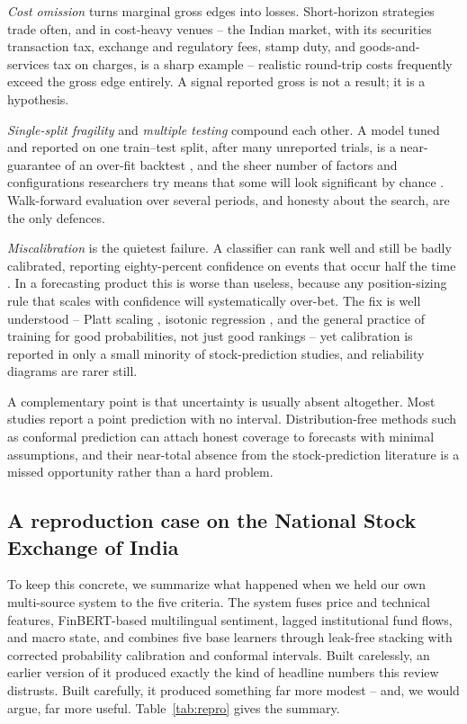 \documentclass[10pt,a4paper,twocolumn]{article}
\begin{document}
\textit{Cost omission} turns marginal gross edges into losses. Short-horizon strategies trade often, and in cost-heavy venues -- the Indian market, with its securities transaction tax, exchange and regulatory fees, stamp duty, and goods-and-services tax on charges, is a sharp example -- realistic round-trip costs frequently exceed the gross edge entirely. A signal reported gross is not a result; it is a hypothesis.

\textit{Single-split fragility} and \textit{multiple testing} compound each other. A model tuned and reported on one train--test split, after many unreported trials, is a near-guarantee of an over-fit backtest \cite{bailey2014}, and the sheer number of factors and configurations researchers try means that some will look significant by chance \cite{harvey2016}. Walk-forward evaluation over several periods, and honesty about the search, are the only defences.

\textit{Miscalibration} is the quietest failure. A classifier can rank well and still be badly calibrated, reporting eighty-percent confidence on events that occur half the time \cite{guo2017}. In a forecasting product this is worse than useless, because any position-sizing rule that scales with confidence will systematically over-bet. The fix is well understood -- Platt scaling \cite{platt1999}, isotonic regression \cite{zadrozny2002}, and the general practice of training for good probabilities, not just good rankings \cite{niculescu2005} -- yet calibration is reported in only a small minority of stock-prediction studies, and reliability diagrams are rarer still.

A complementary point is that uncertainty is usually absent altogether. Most studies report a point prediction with no interval. Distribution-free methods such as conformal prediction \cite{vovk2005,angelopoulos2023} can attach honest coverage to forecasts with minimal assumptions, and their near-total absence from the stock-prediction literature is a missed opportunity rather than a hard problem.

\subsection{A reproduction case on the National Stock Exchange of India}

To keep this concrete, we summarize what happened when we held our own multi-source system to the five criteria. The system fuses price and technical features, FinBERT-based multilingual sentiment, lagged institutional fund flows, and macro state, and combines five base learners through leak-free stacking with corrected probability calibration and conformal intervals. Built carelessly, an earlier version of it produced exactly the kind of headline numbers this review distrusts. Built carefully, it produced something far more modest -- and, we would argue, far more useful. Table~\ref{tab:repro} gives the summary.
\end{document}
